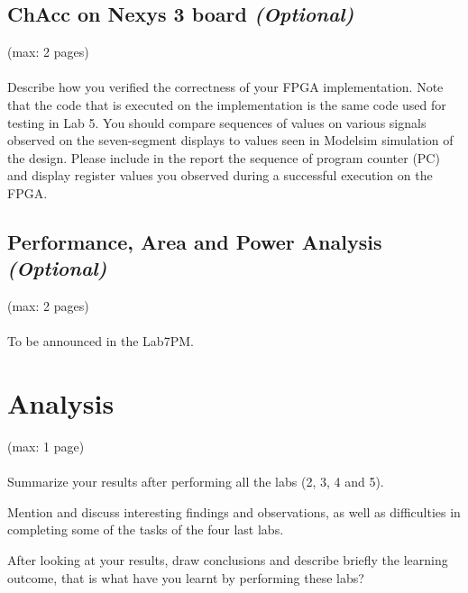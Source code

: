 \documentclass[a4,11pt]{article}
\begin{document}
\subsection{ChAcc on Nexys 3 board \emph{(Optional)}}
(max: 2 pages)
\\\\
Describe how you verified the correctness of your FPGA implementation. Note that the code that is executed on the implementation is the same code used for testing in Lab 5. You should compare sequences of values on various signals observed on the seven-segment displays to values seen in Modelsim simulation of the design. Please include in the report the sequence of program counter (PC) and display register values you observed during a successful execution on the FPGA. 

\subsection{Performance, Area and Power Analysis \emph{(Optional)}}
(max: 2 pages)
\\\\
To be announced in the Lab7PM.

\section{Analysis}
(max: 1 page)
\\\\
Summarize your results after performing all the labs (2, 3, 4 and 5).

Mention and discuss interesting findings and observations, as well as difficulties in completing some of the tasks of the four last labs.

After looking at your results, draw conclusions and describe briefly the learning outcome, that is what have you learnt by performing these labs?  
\end{document}
